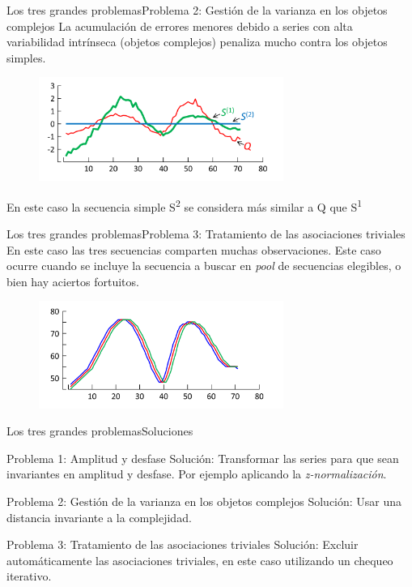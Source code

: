 \documentclass[12pt, aspectratio=169]{beamer} %
\begin{document}
\begin{frame}{Los tres grandes problemas}{Problema 2:  Gestión de la varianza en los objetos complejos}
  La acumulación de errores menores debido a series con alta variabilidad intrínseca (objetos complejos) penaliza mucho contra los objetos simples.

  \begin{figure}
  \includegraphics[width=8cm]{20210312_3_problema_complejos.png}
  \label{fig:problema_2}
\end{figure}

  En este caso la secuencia simple S\textsuperscript{2} se considera  más similar a Q que S\textsuperscript{1}

\end{frame}

\begin{frame}{Los tres grandes problemas}{Problema 3: Tratamiento de las asociaciones triviales}
  En este caso las tres secuencias comparten muchas observaciones.
  Este caso ocurre cuando se incluye la secuencia a buscar en \textit{pool} de secuencias elegibles, o bien hay aciertos fortuitos.
  \begin{figure}
    \includegraphics[width=8cm]{20210312_4_problema_triviales.png}
    \label{fig:problema_3}
  \end{figure}
  
\end{frame}

\begin{frame}{Los tres grandes problemas}{Soluciones}
  \begin{block}{Problema 1: Amplitud y desfase}
    Solución: Transformar las series para que sean invariantes en amplitud y desfase. Por ejemplo aplicando la \textit{z-normalización}.
    
  \end{block}
  \begin{block}{Problema 2: Gestión de la varianza en los objetos complejos}
    Solución: Usar una distancia invariante a la complejidad. 
  \end{block}
  \begin{block}{Problema 3: Tratamiento de las asociaciones triviales}
    Solución: Excluir automáticamente las asociaciones triviales, en este caso utilizando un chequeo iterativo.
  \end{block}
\end{frame}
\end{document}
